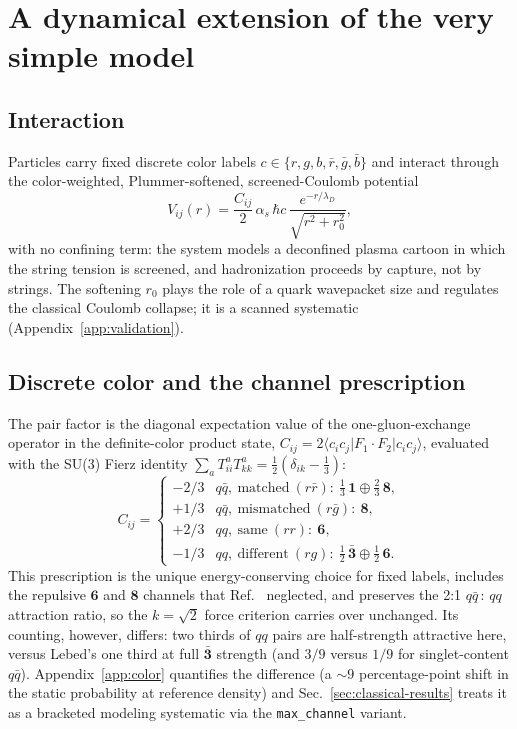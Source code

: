 \section{A dynamical extension of the very simple model}
\label{sec:model}

\subsection{Interaction}

Particles carry fixed discrete color labels
$c\in\{r,g,b,\bar r,\bar g,\bar b\}$ and interact through the
color-weighted, Plummer-softened, screened-Coulomb potential
\begin{equation}
V_{ij}(r) = \frac{C_{ij}}{2}\,\alpha_s\,\hbar c\,
\frac{e^{-r/\lambda_D}}{\sqrt{r^2 + r_0^2}},
\label{eq:potential}
\end{equation}
with no confining term: the system models a deconfined plasma cartoon in
which the string tension is screened, and hadronization proceeds by
capture, not by strings.  The softening $r_0$ plays the role of a quark
wavepacket size and regulates the classical Coulomb collapse; it is a
scanned systematic (Appendix~\ref{app:validation}).

\subsection{Discrete color and the channel prescription}
\label{sec:color-prescription}

The pair factor is the diagonal expectation value of the one-gluon-exchange
operator in the definite-color product state,
$C_{ij}=2\langle c_i c_j|F_1\!\cdot\!F_2|c_i c_j\rangle$, evaluated with the
SU(3) Fierz identity $\sum_a T^a_{ii}T^a_{kk}=\tfrac12(\delta_{ik}-\tfrac13)$:
\begin{equation}
C_{ij} =
\begin{cases}
-2/3 & q\bar q,\ \text{matched}\ (r\bar r):\ \tfrac13\,\mathbf{1}\oplus\tfrac23\,\mathbf{8},\\[2pt]
+1/3 & q\bar q,\ \text{mismatched}\ (r\bar g):\ \mathbf{8},\\[2pt]
+2/3 & qq,\ \text{same}\ (rr):\ \mathbf{6},\\[2pt]
-1/3 & qq,\ \text{different}\ (rg):\ \tfrac12\,\bar{\mathbf 3}\oplus\tfrac12\,\mathbf{6}.
\end{cases}
\label{eq:cij}
\end{equation}
This prescription is the unique energy-conserving choice for fixed labels,
includes the repulsive $\mathbf 6$ and $\mathbf 8$ channels that
Ref.~\cite{Lebed:2016jvq} neglected, and preserves the 2:1
$q\bar q\,{:}\,qq$ attraction ratio, so the $k=\sqrt2$ force criterion
carries over unchanged.  Its counting, however, differs: two thirds of $qq$
pairs are half-strength attractive here, versus Lebed's one third at full
$\bar{\mathbf 3}$ strength (and $3/9$ versus $1/9$ for singlet-content
$q\bar q$).  Appendix~\ref{app:color} quantifies the difference
(a $\sim 9$ percentage-point shift in the static probability at reference
density) and Sec.~\ref{sec:classical-results} treats it as a bracketed
modeling systematic via the \texttt{max\_channel} variant.

